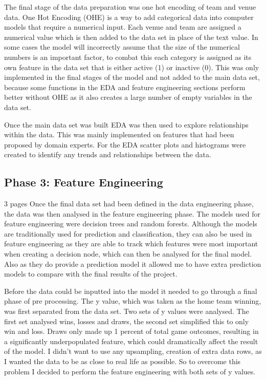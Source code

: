 \documentclass{imc-inf}
\begin{document}
	The final stage of the data preparation was one hot encoding of team and venue data. One Hot Encoding (OHE) is a way to add categorical data into computer models that require a numerical input. Each venue and team are assigned a numerical value which is then added to the data set in place of the text value. In some cases the model will incorrectly assume that the size of the numerical numbers is an important factor, to combat this each category is assigned as its own feature in the data set that is either active (1) or inactive (0). This was only implemented in the final stages of the model and not added to the main data set, because some functions in the EDA and feature engineering sections perform better without OHE as it also creates a large number of empty variables in the data set.
	
	Once the main data set was built EDA was then used to explore relationships within the data. This was mainly implemented on features that had been proposed by domain experts. For the EDA scatter plots and histograms were created to identify any trends and relationships between the data.  
	
	\subsection{Phase 3: Feature Engineering}
	3 pages
	Once the final data set had been defined in the data engineering phase, the data was then analysed in the feature engineering phase. The models used for feature engineering were decision trees and random forests. Although the models are traditionally used for prediction and classification, they can also be used in feature engineering as they are able to track which features were most important when creating a decision node, which can then be analysed for the final model. Also as they do provide a prediction model it allowed me to have extra prediction models to compare with the final results of the project. 
	
	Before the data could be inputted into the model it needed to go through a final phase of pre processing. The y value, which was taken as the home team winning, was first separated from the data set. Two sets of y values were analysed. The first set analysed wins, losses and draws, the second set simplified this to only win and loss. Draws only made up 1 percent of total game outcomes, resulting in a significantly underpopulated feature, which could dramatically affect the result of the model. I didn't want to use any upsampling, creation of extra data rows, as I wanted the data to be as close to real life as possible. So to overcome this problem I decided to perform the feature engineering with both sets of y values.
	
\end{document}
